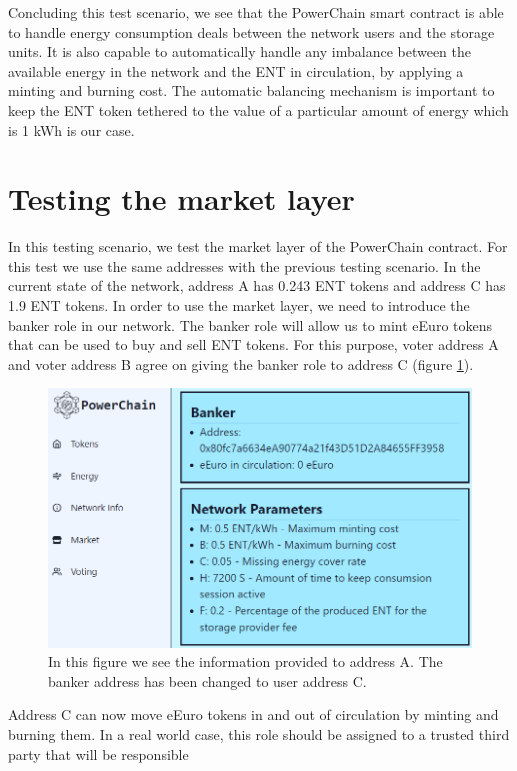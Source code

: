 Concluding this test scenario, we see that the PowerChain smart contract is able to handle energy consumption deals between the network users and the storage units. It is also capable to automatically 
handle any imbalance between the available energy in the network and the ENT in circulation, by applying a minting and burning cost. The automatic balancing mechanism is important to keep the ENT token 
tethered to the value of a particular amount of energy which is 1 kWh is our case.

\section{Testing the market layer}
In this testing scenario, we test the market layer of the PowerChain contract. For this test we use the same addresses with the previous testing scenario. In the current state of the network,
address A has 0.243 ENT tokens and address C has 1.9 ENT tokens. In order to use the market layer, we need to introduce the banker role in our network. The banker role will allow us to mint 
eEuro tokens that can be used to buy and sell ENT tokens. For this purpose, voter address A and voter address B agree on giving the banker role to address C (figure \ref{fig:new_banker}).
\begin{figure}[h!]
    \centering
    \includegraphics[width=\linewidth,frame,scale=0.7]{Figures/change_banker.png}
    \caption{In this figure we see the information provided to address A. The banker address has been changed to user address C.}
    \label{fig:new_banker}
\end{figure}
Address C can now move eEuro tokens in and out of circulation by minting and burning them. In a real world case, this role should be assigned to a trusted third party that will be responsible
